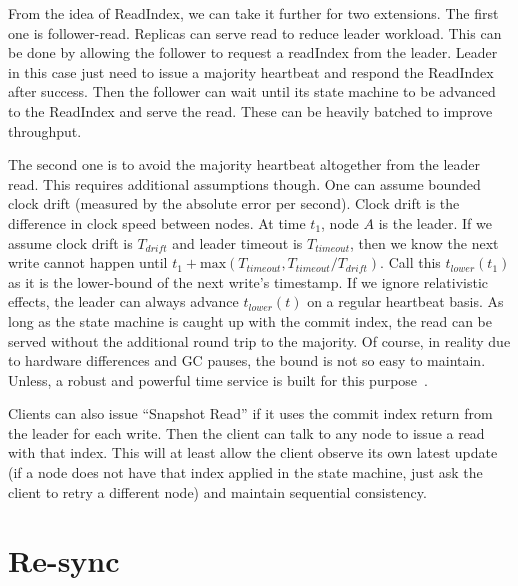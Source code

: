 From the idea of ReadIndex, we can take it further for two extensions. The first
one is follower-read. Replicas can serve read to reduce leader workload. This can
be done by allowing the follower to request a readIndex from the leader. Leader in
this case just need to issue a majority heartbeat and respond the ReadIndex after
success. Then the follower can wait until its state machine to be advanced to the
ReadIndex and serve the read. These can be heavily batched to improve throughput.

The second one is to avoid the majority heartbeat altogether from the leader
read. This requires additional assumptions though. One can assume bounded
clock drift (measured by the absolute error per second). Clock drift is the
difference in clock speed between nodes. At time $t_1$, node $A$ is the
leader. If we assume clock drift is $T_{drift}$ and leader timeout is
$T_{timeout}$, then we know the next write cannot happen until $t_1 +
\textrm{max}(T_{timeout}, T_{timeout} / T_{drift})$. Call this
$t_{lower}(t_1)$ as it is the lower-bound of the next write's timestamp. If
we ignore relativistic effects, the leader can always advance $t_{lower}(t)$
on a regular heartbeat basis. As long as the state machine is caught up with
the commit index, the read can be served without the additional round trip to
the majority. Of course, in reality due to hardware differences and GC
pauses, the bound is not so easy to maintain. Unless, a robust and powerful time
service is built for this purpose~\cite{Cooper_2013}.

Clients can also issue ``Snapshot Read'' if it uses the commit index
return from the leader for each write. Then the client can talk to any node
to issue a read with that index. This will at least allow the client observe
its own latest update (if a node does not have that index applied in the
state machine, just ask the client to retry a different node) and maintain
sequential consistency.


\section{Re-sync}

{}


